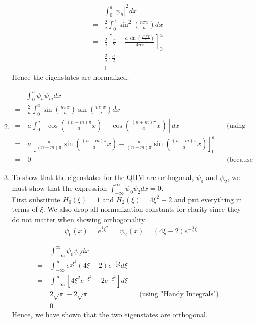 \documentclass[10pt]{article}
\begin{document}
\begin{enumerate}
\begin{enumerate}
    \begin{align*}
      & \int_{0}^{a} \left| \psi_n \right|^2 dx \\
      =& \frac{2}{a} \int_{0}^{a} \sin ^2 \left( \frac{n \pi x}{a} \right) dx\\
      =& \frac{2}{a} \left[ \frac{x}{2} - \frac{a \sin \left( \frac{2 n\pi x}{a} \right)}{4 n\pi} \right]_0^a \\
      =& \frac{2}{a} \cdot \frac{a}{2} \\
      =& 1
    \end{align*}
    Hence the eigenstates are normalized.
  \item 
    \begin{align*}
      &\int_{0}^{a} \psi_n \psi_m dx \\
     =&~\frac{2}{a} \int_{0}^{a} \sin \left( \frac{n \pi x}{a} \right) \sin \left( \frac{m \pi x}{a} \right) dx \\ 
     =&~a \int_{0}^{a} \left[ \cos \left( \frac{\left( n-m \right)\pi}{a}x \right) - \cos \left( \frac{\left( n+m \right)\pi}{a}x \right) \right]dx && \text{(using the trig identity from 1c)} \\
     =&~a \left[ \frac{a}{\left( n-m \right)\pi} \sin \left( \frac{\left( n-m \right)\pi}{a}x \right) - \frac{a}{\left( n+m \right)\pi} \sin \left( \frac{\left( n+m \right)\pi}{a}x \right) \right]_0^a \\
     =&~0 && \text{(because m and n are integers)}
   \end{align*}
  \item 
    To show that the eigenstates for the QHM are orthogonal, $ \psi_0 $ and $ \psi_2 $, we must show that the expression $ \int_{-\infty}^{\infty} \psi_0 \psi_2 dx = 0$. \\
    First substitute $ H_0 \left( \xi \right)=1 $ and $ H_2 \left( \xi \right)=4\xi^2-2 $ and put everything in terms of $ \xi $.
    We also drop all normalization constants for clarity since they do not matter when showing orthogonality:
    \begin{align*}
      &\psi_0 \left( x \right) = e ^ {\frac{1}{2}\xi ^2} && \psi_2 \left( x \right) = \left( 4 \xi - 2 \right) e ^ {- \frac{1}{2} \xi}
    \end{align*}

    \begin{align*}
      &~\int_{-\infty}^{\infty} \psi_0 \psi_2 dx \\
     =&~\int_{-\infty}^{\infty} e ^ {\frac{1}{2}\xi ^2} \left( 4 \xi - 2 \right) e ^ {- \frac{1}{2} \xi} d\xi \\
     =&~ \int_{-\infty}^{\infty} \left[ 4\xi^2 e ^ {-\xi^2} -2e ^ {-\xi^2} \right]d\xi \\
     =&~ 2 \sqrt{\pi} - 2 \sqrt{\pi} && \text{(using "Handy Integrals")} \\
     =&~ 0
    \end{align*}
    Hence, we have shown that the two eigenstates are orthogonal.
    

\end{enumerate}
\end{enumerate}
\end{document}
